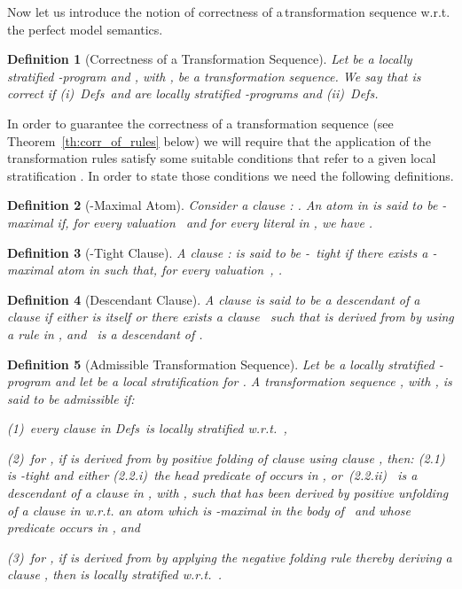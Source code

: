 \documentclass[english]{tlp}
\newtheorem{definition}{Definition} \newtheorem{example}{Example}       \newtheorem{remark}{Remark}
\newcommand{\Mathit}[1]{\mbox{\it #1}}
\newcommand{\Defsn}{\Mathit{Defs}}
\begin{document}
Now let us introduce the notion of correctness of a\,transformation
sequence w.r.t.\,the perfect model semantics.

\begin{definition}
[Correctness of a Transformation Sequence]
\label{def:correctness-of-transf-sequence} Let  be a locally
stratified -program and , with ,
 be a transformation
sequence. We say that  is {\em correct} if
(i)~\Defsn~and  are locally stratified
-programs and (ii)~\Defsn.
\end{definition}


In order to guarantee the correctness of a transformation sequence
 (see Theorem~\ref{th:corr_of_rules} below) we
will require that the application of the transformation rules
satisfy some suitable conditions that refer to a given local
stratification . In order to state those
conditions we need the following definitions.
\vspace{0mm}
 
\begin{definition}
[-Maximal Atom] \label{def:sigma-maximal} Consider a clause
: . An atom  in  is
said to be {\em -maximal} if, for every
valuation~ and for every literal  in , we have
.
\end{definition}
\vspace{-2mm}

\begin{definition}
[-Tight Clause]\label{def:sigma-tight-definition}
A clause :  is said to be {\mbox{-{\em
tight}}} if there exists a -maximal atom  in 
such that, for every valuation~, .
\end{definition}
\vspace{-2mm}

\begin{definition}
[Descendant Clause] \label{def:descen-clause-definition} A clause
 is said to be a {\em descendant} of a clause  if
{\it{either}}  is  itself {\it{or}} there exists a
clause~ such that  is {\it{derived from}}  by
using a rule in , and~ is a descendant of .
\end{definition}
\vspace{-2mm}

\begin{definition}
[Admissible Transformation Sequence] \label{def:adm-transformation}
Let  be a locally stratified -program and let
 be a local stratification for . A transformation
sequence , with , is said to be \emph{admissible} if:

\noindent\textup{(1)}~every clause in \Defsn \ is locally stratified w.r.t.~,

\noindent \textup{(2)}~for , if  is
derived from  by positive folding of clause 
 using clause , then: (2.1)~ is 
-tight and {\em either} (2.2.i)~the head
predicate of  occurs in , {\em or}~(2.2.ii)~ is a
descendant of a clause  in , with , such that  has been derived by positive unfolding of a clause
 in  w.r.t. an atom 
which is -maximal in the body of~
and whose predicate occurs in , and

\noindent \textup{(3)}~for , if  is
derived from  by applying the negative folding rule thereby
deriving a clause , then  is locally stratified
w.r.t.~.
\end{definition}
\end{document}
